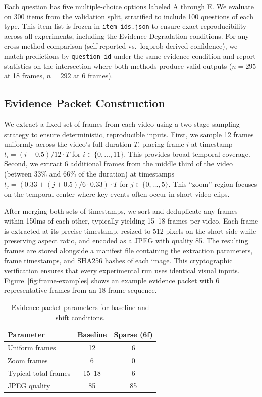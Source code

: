\documentclass{article}
\begin{document}
Each question has five multiple-choice options labeled A through E. We evaluate on 300 items from the validation split, stratified to include 100 questions of each type. This item list is frozen in \texttt{item\_ids.json} to ensure exact reproducibility across all experiments, including the Evidence Degradation conditions. For any cross-method comparison (self-reported vs.\ logprob-derived confidence), we match predictions by \texttt{question\_id} under the same evidence condition and report statistics on the intersection where both methods produce valid outputs ($n=295$ at 18 frames, $n=292$ at 6 frames).

\subsection{Evidence Packet Construction}

We extract a fixed set of frames from each video using a two-stage sampling strategy to ensure deterministic, reproducible inputs. First, we sample 12 frames uniformly across the video's full duration $T$, placing frame $i$ at timestamp $t_i = (i + 0.5) / 12 \cdot T$ for $i \in \{0, \ldots, 11\}$. This provides broad temporal coverage. Second, we extract 6 additional frames from the middle third of the video (between 33\% and 66\% of the duration) at timestamps $t_j = (0.33 + (j + 0.5) / 6 \cdot 0.33) \cdot T$ for $j \in \{0, \ldots, 5\}$. This ``zoom'' region focuses on the temporal center where key events often occur in short video clips.

After merging both sets of timestamps, we sort and deduplicate any frames within 150ms of each other, typically yielding 15--18 frames per video. Each frame is extracted at its precise timestamp, resized to 512 pixels on the short side while preserving aspect ratio, and encoded as a JPEG with quality 85. The resulting frames are stored alongside a manifest file containing the extraction parameters, frame timestamps, and SHA256 hashes of each image. This cryptographic verification ensures that every experimental run uses identical visual inputs. Figure~\ref{fig:frame-examples} shows an example evidence packet with 6 representative frames from an 18-frame sequence.

\begin{table}[h]
\centering
\begin{tabular}{lcc}
\toprule
\textbf{Parameter} & \textbf{Baseline} & \textbf{Sparse (6f)} \\
\midrule
Uniform frames & 12 & 6 \\
Zoom frames & 6 & 0 \\
Typical total frames & 15--18 & 6 \\
JPEG quality & 85 & 85 \\
\bottomrule
\end{tabular}
\caption{Evidence packet parameters for baseline and shift conditions.}
\label{tab:evidence-params}
\end{table}
\end{document}
